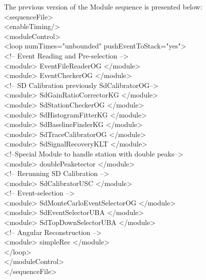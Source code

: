 The previous version of the Module sequence is presented below:
\begingroup
  \selectfont \\ 
  \noindent <sequenceFile>\\
  \null\quad <enableTiming/>\\
  \null\quad <moduleControl>\\
  \null\qquad <loop numTimes="unbounded" pushEventToStack="yes"> \\
    \null\qquad \quad  <!-- Event Reading and Pre-selection -->\\
    \null\qquad \quad  <module> EventFileReaderOG </module>\\
    \null \qquad \quad  <module> EventCheckerOG </module>\\
    \null\qquad \quad  <!-- SD Calibration previously SdCalibratorOG-->\\
    \null\qquad \quad   <module> SdGainRatioCorrectorKG </module>\\
    \null\qquad \quad   <module> SdStationCheckerOG </module>\\
    \null\qquad \quad   <module> SdHistogramFitterKG </module>\\
    \null\qquad \quad   <module> SdBaselineFinderKG </module>\\
    \null\qquad \quad   <module> SdTraceCalibratorOG </module>\\
    \null\qquad \quad   <module> SdSignalRecoveryKLT </module>\\
    \null\qquad \quad  <!--Special Module to handle station with double peaks-->\\
    \null\qquad \quad   <module> doublePeaketector </module>\\
    \null\qquad \quad  <!-- Rerunning SD Calibration -->\\
    \null\qquad \quad   <module> SdCalibratorUSC </module>\\
    \null\qquad \quad  <!-- Event-selection -->\\
    \null\qquad \quad   <module> SdMonteCarloEventSelectorOG </module>\\
    \null\qquad \quad   <module> SdEventSelectorUBA </module>\\
    \null\qquad \quad   <module> SdTopDownSelectorUBA </module>\\
    \null\qquad \quad  <!-- Angular Reconstruction -->\\
    \null\qquad \quad   <module> simpleRec </module>\\
  \null \qquad  </loop>\\
  \null \quad  </moduleControl>\\
   </sequenceFile>\\
\endgroup

